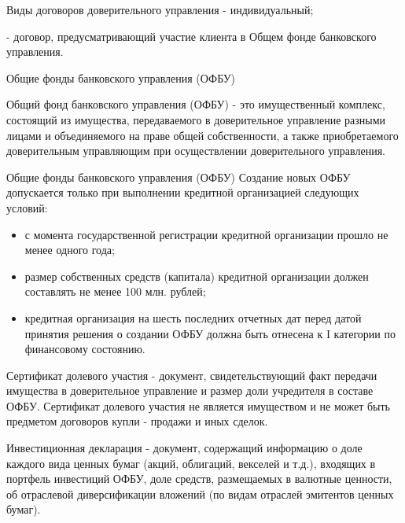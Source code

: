 \documentclass[_Banking_p3.tex]{subfiles}
\begin{document}
\begin{frame}{Виды договоров доверительного управления}
- индивидуальный;

- договор, предусматривающий участие клиента в Общем фонде банковского управления. 
\end{frame}

\begin{frame}{Общие фонды банковского управления (ОФБУ)}
\begin{block}{Общий фонд банковского управления (ОФБУ)}
\quad
- это имущественный комплекс, состоящий из имущества, передаваемого в доверительное управление разными лицами и объединяемого на праве общей собственности, а также приобретаемого доверительным управляющим при осуществлении доверительного управления.
\end{block}
\end{frame}
\begin{frame}{Общие фонды банковского управления (ОФБУ)}
Создание новых ОФБУ допускается только при выполнении кредитной организацией следующих условий:
\begin{itemize}[<+->]
\item
с момента государственной регистрации кредитной организации прошло не менее одного года;
\item
размер собственных средств (капитала) кредитной организации должен составлять не менее 100 млн. рублей;
\item
кредитная организация на шесть последних отчетных дат перед датой принятия решения о создании ОФБУ должна быть отнесена к I категории по финансовому состоянию.

\end{itemize}
\end{frame}

\begin{frame}
\begin{block}{Сертификат долевого участия }
\quad
- документ, свидетельствующий факт передачи имущества в доверительное управление и размер доли учредителя в составе ОФБУ. Сертификат долевого участия не является имуществом и не может быть предметом договоров купли - продажи и иных сделок.
\end{block}
\end{frame}

\begin{frame}
\begin{block}{Инвестиционная декларация }
\quad
- документ, содержащий информацию о доле каждого вида ценных бумаг (акций, облигаций, векселей и т.д.), входящих в портфель инвестиций ОФБУ, доле средств, размещаемых в валютные ценности, об отраслевой диверсификации вложений (по видам отраслей эмитентов ценных бумаг).
\end{block}
\end{frame}
\end{document}

